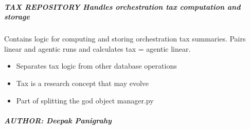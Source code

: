\documentclass[letterpaper,10pt,english]{sphinxmanual}
\begin{document}
\subparagraph{TAX REPOSITORY \textendash{} Handles orchestration tax computation and storage}
\label{\detokenize{core.database.repositories.tax:tax-repository-handles-orchestration-tax-computation-and-storage}}\begin{description}
\sphinxAtStartPar
Contains logic for computing and storing orchestration tax summaries.
Pairs linear and agentic runs and calculates tax = agentic \sphinxhyphen{} linear.

\begin{itemize}
\item {} 
\sphinxAtStartPar
Separates tax logic from other database operations

\item {} 
\sphinxAtStartPar
Tax is a research concept that may evolve

\item {} 
\sphinxAtStartPar
Part of splitting the god object manager.py

\end{itemize}

\end{description}


\subparagraph{AUTHOR: Deepak Panigrahy}
\label{\detokenize{core.database.repositories.tax:author-deepak-panigrahy}}
\end{document}
